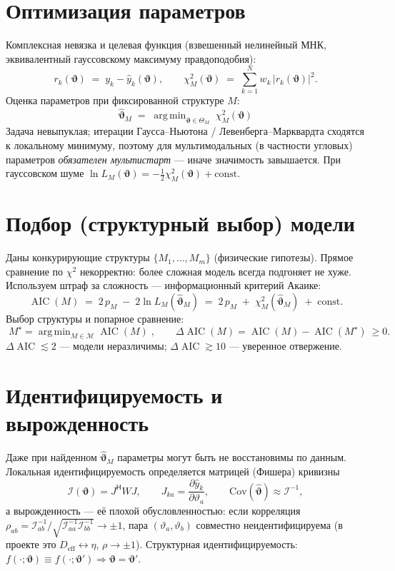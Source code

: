 \documentclass[11pt]{article}
\newcommand{\vth}{\bm{\vartheta}}
\newcommand{\Deff}{D_{\mathrm{eff}}}
\DeclareMathOperator*{\argmin}{arg\,min}
\DeclareMathOperator{\AIC}{AIC}
\begin{document}
\section{Оптимизация параметров}
Комплексная невязка и целевая функция (взвешенный нелинейный МНК, эквивалентный
гауссовскому максимуму правдоподобия):
\[
  r_k(\vth)\;=\;y_k-\hat y_k(\vth),
  \qquad
  \chi^2_M(\vth)\;=\;\sum_{k=1}^{N} w_k\,\bigl|r_k(\vth)\bigr|^2 .
\]
Оценка параметров при фиксированной структуре $M$:
\[
  \boxed{\;\hat{\vth}_M \;=\; \argmin_{\vth\in\Theta_M}\;\chi^2_M(\vth)\;}
\]
Задача невыпуклая; итерации Гаусса--Ньютона / Левенберга--Марквардта сходятся к локальному
минимуму, поэтому для мультимодальных (в частности угловых) параметров \emph{обязателен
мультистарт} — иначе значимость завышается. При гауссовском шуме
$\ln L_M(\vth)=-\tfrac12\chi^2_M(\vth)+\mathrm{const}$.

\section{Подбор (структурный выбор) модели}
Даны конкурирующие структуры $\{M_1,\dots,M_m\}$ (физические гипотезы). Прямое сравнение по
$\chi^2$ некорректно: более сложная модель всегда подгоняет не хуже. Используем штраф за
сложность — информационный критерий Акаике:
\[
  \AIC(M)\;=\;2\,p_M\;-\;2\ln L_M(\hat{\vth}_M)
  \;=\;2\,p_M\;+\;\chi^2_M(\hat{\vth}_M)\;+\;\mathrm{const}.
\]
Выбор структуры и попарное сравнение:
\[
  \boxed{\;M^\star=\argmin_{M\in\mathcal{M}}\AIC(M)\;},
  \qquad
  \Delta\AIC(M)=\AIC(M)-\AIC(M^\star)\ \ge 0 .
\]
$\Delta\AIC\lesssim 2$ — модели неразличимы; $\Delta\AIC\gtrsim 10$ — уверенное отвержение.

\section{Идентифицируемость и вырожденность}
Даже при найденном $\hat{\vth}_M$ параметры могут быть не восстановимы по данным. Локальная
идентифицируемость определяется матрицей (Фишера) кривизны
\[
  \mathcal{I}(\vth)=J^{\mathsf H}WJ,\qquad
  J_{ka}=\frac{\partial \hat y_k}{\partial \vartheta_a},\qquad
  \mathrm{Cov}(\hat{\vth})\approx \mathcal{I}^{-1},
\]
а вырожденность — её плохой обусловленностью: если корреляция
$\rho_{ab}=\mathcal{I}^{-1}_{ab}/\sqrt{\mathcal{I}^{-1}_{aa}\mathcal{I}^{-1}_{bb}}\to\pm1$, пара
$(\vartheta_a,\vartheta_b)$ совместно неидентифицируема (в проекте это $\Deff\leftrightarrow\eta$,
$\rho\to\pm1$). Структурная идентифицируемость: $f(\cdot;\vth)\equiv f(\cdot;\vth')\Rightarrow
\vth=\vth'$.
\end{document}
